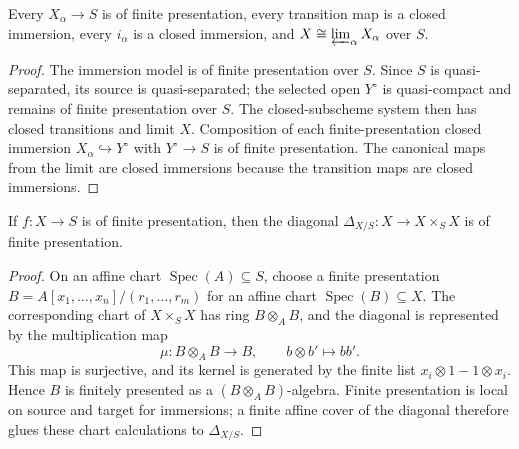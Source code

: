 \begin{lemma}
  \label{lemma:nagata-finite-type-fp-model-system}

  Every $X_\alpha\to S$ is of finite presentation, every transition map is a
  closed immersion, every $i_\alpha$ is a closed immersion, and
  $X\cong\varprojlim_\alpha X_\alpha$ over $S$.
\end{lemma}

\begin{proof}
  The immersion model is of finite presentation over $S$.  Since $S$ is
  quasi-separated, its source is quasi-separated; the selected open
  $Y^\circ$ is quasi-compact and remains of finite presentation over $S$.
  The closed-subscheme system then has closed transitions and limit $X$.
  Composition of each finite-presentation closed immersion
  $X_\alpha\hookrightarrow Y^\circ$ with $Y^\circ\to S$ is of finite
  presentation.  The canonical maps from the limit are closed immersions
  because the transition maps are closed immersions.
\end{proof}

\begin{lemma}
  \label{lemma:nagata-diagonal-finite-presentation}

  If $f\colon X\to S$ is of finite presentation, then the diagonal
  $\Delta_{X/S}\colon X\to X\times_S X$ is of finite presentation.
\end{lemma}

\begin{proof}
  On an affine chart $\operatorname{Spec}(A)\subseteq S$, choose a finite
  presentation
  $B=A[x_1,\ldots,x_n]/(r_1,\ldots,r_m)$ for an affine chart
  $\operatorname{Spec}(B)\subseteq X$.  The corresponding chart of
  $X\times_SX$ has ring $B\otimes_A B$, and the diagonal is represented by the
  multiplication map
  \[
    \mu\colon B\otimes_A B\longrightarrow B,\qquad b\otimes b'\longmapsto bb'.
  \]
  This map is surjective, and its kernel is generated by the finite list
  $x_i\otimes1-1\otimes x_i$.  Hence $B$ is finitely presented as a
  $(B\otimes_A B)$-algebra.  Finite presentation is local on source and
  target for immersions; a finite affine cover of the diagonal therefore
  glues these chart calculations to $\Delta_{X/S}$.
\end{proof}

